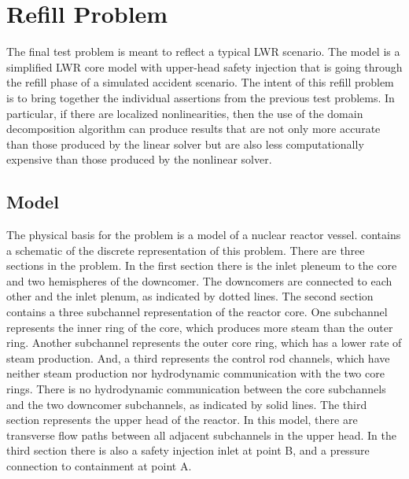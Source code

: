 \section{Refill Problem}
\label{sect:refillProblem}

The final test problem is meant to reflect a typical LWR scenario.
The model is a simplified LWR core model with upper-head safety injection that is going through the refill phase of a simulated accident scenario.
The intent of this refill problem is to bring together the individual assertions from the previous test problems.
In particular, if there are localized nonlinearities, then the use of the domain decomposition algorithm can produce results that are not only more accurate than those produced by the linear solver but are also less computationally expensive than those produced by the nonlinear solver.

\subsection{Model}
\label{sect:refillModel}

The physical basis for the problem is a model of a nuclear reactor vessel.
 contains a schematic of the discrete representation of this problem.
There are three sections in the problem.
In the first section there is the inlet pleneum to the core and two hemispheres of the downcomer.
The downcomers are connected to each other and the inlet plenum, as indicated by dotted lines.
The second section contains a three subchannel representation of the reactor core.
One subchannel represents the inner ring of the core, which produces more steam than the outer ring.
Another subchannel represents the outer core ring, which has a lower rate of steam production.
And, a third represents the control rod channels, which have neither steam production nor hydrodynamic communication with the two core rings.
There is no hydrodynamic communication between the core subchannels and the two downcomer subchannels, as indicated by solid lines.
The third section represents the upper head of the reactor.
In this model, there are transverse flow paths between all adjacent subchannels in the upper head.
In the third section there is also a safety injection inlet at point B, and a pressure connection to containment at point A.

